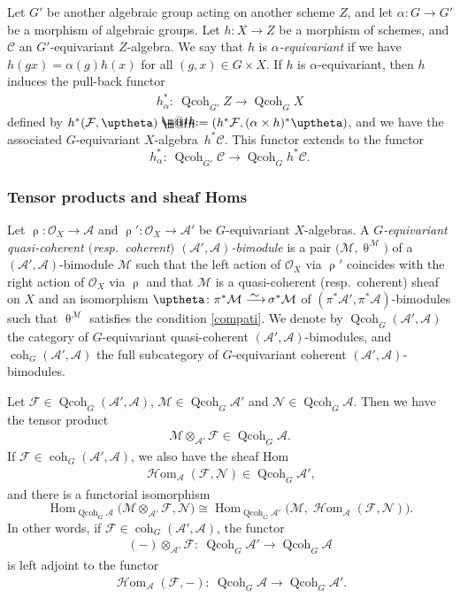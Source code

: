 \documentclass[10pt,a4paper]{amsart}
\makeatletter
\newcommand*{\defeq}{\mathrel{\rlap{%
 \raisebox{0.3ex}{$\m@th\cdot$}}%
 \raisebox{-0.3ex}{$\m@th\cdot$}}%
 =}
\numberwithin{equation}{section}
\newcommand{\Hom}{\operatorname{Hom}}
\newcommand{\cHom}{\operatorname{{\mathcal H}om}}
\newcommand{\coh}{\operatorname{coh}}
\newcommand{\Qcoh}{\operatorname{Qcoh}}
\newcommand{\cA}{\mathcal{A}}
\newcommand{\cC}{\mathcal{C}}
\newcommand{\cF}{\mathcal{F}}
\newcommand{\cM}{\mathcal{M}}
\newcommand{\cN}{\mathcal{N}}
\newcommand{\cO}{\mathcal{O}}
\newcommand{\simto}{\,\,\,\,\raisebox{4pt}{$\sim$}{\kern -1.1em \longrightarrow}\,}
\makeatother
\begin{document}
 Let $G'$ be another algebraic group acting on another scheme $Z$, and let $\alpha\colon G\to G'$ be a morphism of algebraic groups. Let $h\colon X\to Z$ be a morphism of schemes, and $\cC$ an $G'$-equivariant $Z$-algebra. We say that $h$ is {\it $\alpha$-equivariant} if we have $h(g x)=\alpha(g)h(x)$ for all $(g,x)\in G\times X$. If $h$ is $\alpha$-equivariant, then $h$ induces the pull-back functor
\begin{gather*}
h^*_{\alpha}\colon\ \Qcoh_{G'}Z\to \Qcoh_GX
\end{gather*}
defined by $h^*(\cF,\uptheta)\defeq(h^*\cF, (\alpha\times h)^*\uptheta)$, and we have
 the associated $G$-equivariant $X$-alge\-bra~$h^*\cC$. This functor extends to
the functor
\begin{equation*}%
h^*_{\alpha}\colon\ \Qcoh_{G'}\cC\to \Qcoh_Gh^*\cC.
\end{equation*}

\subsubsection{Tensor products and sheaf Homs}

Let $\uprho\colon\cO_{X}\to\cA$ and $\uprho'\colon\cO_{X}\to\cA'$ be $G$-equivariant $X$-algebras. A {\it $G$-equivariant quasi-coherent $($resp.\ coherent$)$ $(\cA',\cA)$-bimodule} is a pair $\big(\cM,\uptheta^{\cM}\big)$ of a $(\cA',\cA)$-bimodule $\cM$ such that the left action of $\cO_{X}$ via $\uprho'$ coincides with the right action of $\cO_{X}$ via $\uprho$ and that $\cM$ is a quasi-coherent (resp.\ coherent) sheaf on $X$ and an isomorphism $\uptheta\colon \pi^*\cM\simto\sigma^*\cM$ of $(\pi^*\cA',\pi^*\cA)$-bimodules such that $\uptheta^{\cM}$ satisfies the condition \eqref{compati}.
 We denote by
$\Qcoh_G(\cA',\cA)$ the category of $G$-equivariant quasi-coherent $(\cA',\cA)$-bimodules, and $\coh_G(\cA',\cA)$ the full subcategory of $G$-equivariant coherent $(\cA',\cA)$-bimodules.


Let $\cF\in \Qcoh_G(\cA',\cA)$, $\cM\in\Qcoh_G\cA'$ and $\cN\in \Qcoh_G\cA$. Then we have the tensor product
\begin{gather*}
\cM\otimes_{\cA'}\cF\in \Qcoh_G\cA.
\end{gather*}
If $\cF\in \coh_G(\cA',\cA)$, we also have the sheaf Hom
\begin{gather*}
\cHom_{\cA}(\cF,\cN)\in \Qcoh_G\cA',
\end{gather*}
and there is a functorial isomorphism
\begin{equation*}%
\Hom_{\Qcoh_G\cA}\big(\cM\otimes_{\cA'}\cF,\cN\big)\cong \Hom_{\Qcoh_G\cA'}\big(\cM,\cHom_{\cA}(\cF,\cN)\big).
\end{equation*}
In other words, if $\cF\in \coh_G(\cA',\cA)$, the functor
\begin{gather*}
(-)\otimes_{\cA'}\cF\colon\ \Qcoh_G\cA'\to\Qcoh_G\cA
\end{gather*}
is left adjoint to the functor
\begin{gather*}
\cHom_{\cA}(\cF,-)\colon\ \Qcoh_G\cA\to\Qcoh_G \cA'.
\end{gather*}
\end{document}
